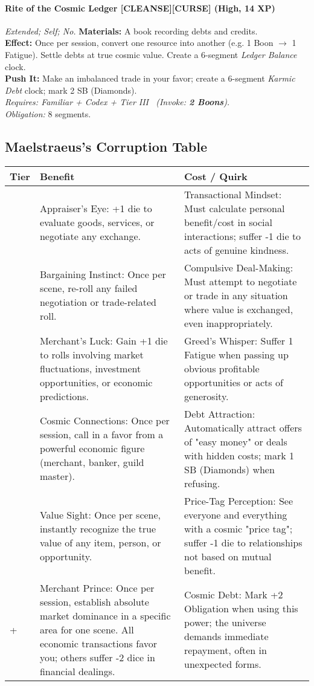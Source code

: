 \paragraph{Rite of the Cosmic Ledger \textnormal{[CLEANSE][CURSE]} (High, 14 XP)} \emph{Extended; Self; No.}
\textbf{Materials:} A book recording debts and credits.\\
\textbf{Effect:} Once per session, convert one resource into another (e.g. 1 Boon $\rightarrow$ 1 Fatigue). Settle debts at true cosmic value. Create a 6-segment \emph{Ledger Balance} clock.\\
\textbf{Push It:} Make an imbalanced trade in your favor; create a 6-segment \emph{Karmic Debt} clock; mark 2 SB (Diamonds).\\
\emph{Requires: Familiar + Codex + Tier III \ (\textit{Invoke:} \textbf{2 Boons}).}\\
\emph{Obligation:} 8 segments.

\subsection*{Maelstraeus's Corruption Table}
\label{sec:maelstraeus-corruption}

\begin{longtable}{>{\raggedright\arraybackslash}p{1cm} p{5cm} p{5cm}}
\toprule
\textbf{Tier} & \textbf{Benefit} & \textbf{Cost / Quirk} \\
\midrule
1 & Appraiser's Eye: +1 die to evaluate goods, services, or negotiate any exchange. & Transactional Mindset: Must calculate personal benefit/cost in social interactions; suffer -1 die to acts of genuine kindness. \\
\midrule
2 & Bargaining Instinct: Once per scene, re-roll any failed negotiation or trade-related roll. & Compulsive Deal-Making: Must attempt to negotiate or trade in any situation where value is exchanged, even inappropriately. \\
\midrule
3 & Merchant's Luck: Gain +1 die to rolls involving market fluctuations, investment opportunities, or economic predictions. & Greed's Whisper: Suffer 1 Fatigue when passing up obvious profitable opportunities or acts of generosity. \\
\midrule
4 & Cosmic Connections: Once per session, call in a favor from a powerful economic figure (merchant, banker, guild master). & Debt Attraction: Automatically attract offers of "easy money" or deals with hidden costs; mark 1 SB (Diamonds) when refusing. \\
\midrule
5 & Value Sight: Once per scene, instantly recognize the true value of any item, person, or opportunity. & Price-Tag Perception: See everyone and everything with a cosmic "price tag"; suffer -1 die to relationships not based on mutual benefit. \\
\midrule
6+ & Merchant Prince: Once per session, establish absolute market dominance in a specific area for one scene. All economic transactions favor you; others suffer -2 dice in financial dealings. & Cosmic Debt: Mark +2 Obligation when using this power; the universe demands immediate repayment, often in unexpected forms. \\
\bottomrule
\end{longtable}